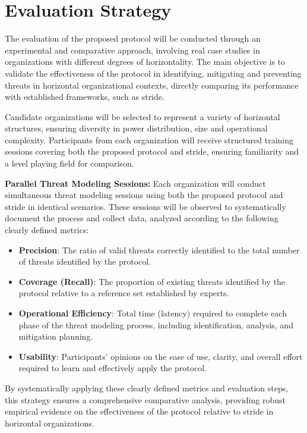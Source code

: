 \section{Evaluation Strategy}
\label{sec:evaluation_strategy}

The evaluation of the proposed protocol will be conducted through an
experimental and comparative approach, involving real case studies in
organizations with different degrees of horizontality. The main objective is to
validate the effectiveness of the protocol in identifying, mitigating and
preventing threats in horizontal organizational contexts, directly comparing its
performance with established frameworks, such as \gls{stride}.

Candidate organizations will be selected to represent a variety of horizontal
structures, ensuring diversity in power distribution, size and operational
complexity. Participants from each organization will receive structured training
sessions covering both the proposed protocol and \gls{stride}, ensuring
familiarity and a level playing field for comparison.

\textbf{Parallel Threat Modeling Sessions:}
Each organization will conduct simultaneous threat modeling sessions using both
the proposed protocol and \gls{stride} in identical scenarios. These sessions
will be observed to systematically document the process and collect data,
analyzed according to the following clearly defined metrics:

\begin{itemize}
\item \textbf{Precision}: The ratio of valid threats correctly identified to the
total number of threats identified by the protocol.
\item \textbf{Coverage (Recall)}: The proportion of existing threats identified
by the protocol relative to a reference set established by experts.
\item \textbf{Operational Efficiency}: Total time (latency) required to complete
each phase of the threat modeling process, including identification, analysis,
and mitigation planning.
\item \textbf{Usability}: Participants' opinions on the ease of use, clarity,
and overall effort required to learn and effectively apply the protocol.
\end{itemize}

By systematically applying these clearly defined metrics and evaluation steps,
this strategy ensures a comprehensive comparative analysis, providing robust
empirical evidence on the effectiveness of the protocol relative to \gls{stride}
in horizontal organizations.

